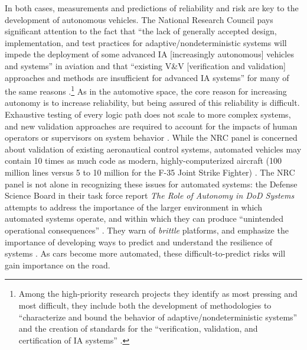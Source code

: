 In both cases, measurements and predictions of reliability and risk
are key to the development of autonomous vehicles. The National Research Council pays
significant attention to the fact that ``the lack of generally
accepted design, implementation, and test practices for
adaptive/nondeterministic systems will impede the deployment of some
advanced IA [increasingly autonomous] vehicles and systems'' in aviation and that
``existing V\&V [verification and
  validation] approaches and methods are insufficient for advanced IA
systems'' for many of the same reasons \cite[p.
  2]{NRCAutonomy}.\footnote{Among the high-priority research projects
  they identify as 
most pressing and most difficult, they include both the development of
methodologies to ``characterize and bound the behavior of
adaptive/nondeterministic systems'' and the creation of standards for
the ``verification, validation, and certification of IA
systems'' \cite[p. 4]{NRCAutonomy}.} As in the automotive space, the
core reason for increasing autonomy is to increase reliability, but
being assured of this reliability is difficult. Exhaustive testing of
every logic path does not scale to more complex systems, and new 
validation approaches are required to account for the impacts of human
operators or supervisors on system behavior \cite[p.
  39--40]{NRCAutonomy}. While
the NRC panel is concerned about validation of existing aeronautical
control systems, automated vehicles may contain 10 times as much code
as modern, highly-computerized aircraft (100 million lines versus 5 to
10 million for the F-35 Joint Strike Fighter)
\cite{reutersF35}.
The NRC panel is not alone in recognizing these 
issues for automated systems: the Defense Science Board in their task force report \emph{The
  Role of Autonomy in DoD Systems} attempts to address the importance
of the larger environment in which automated systems operate, and
within which they can produce ``unintended operational
consequences'' \cite[p. 2]{DSB}. They warn of \emph{brittle}
platforms, and emphasize the importance of developing ways to predict
and understand the resilience of systems \cite[p. 7, 11]{DSB}. As cars
become more automated, these difficult-to-predict risks will gain
importance on the road.


